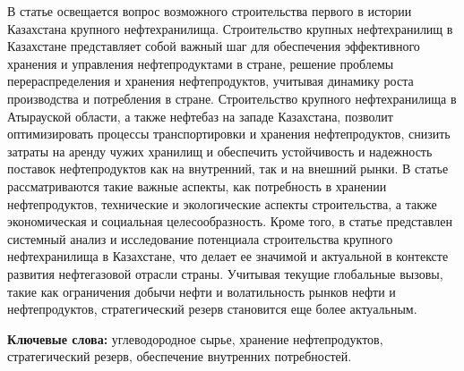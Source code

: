 В статье освещается вопрос возможного строительства первого в истории
Казахстана крупного нефтехранилища. Строительство крупных нефтехранилищ
в Казахстане представляет собой важный шаг для обеспечения эффективного
хранения и управления нефтепродуктами в стране, решение проблемы
перераспределения и хранения нефтепродуктов, учитывая динамику роста
производства и потребления в стране. Строительство крупного
нефтехранилища в Атырауской области, а также нефтебаз на западе
Казахстана, позволит оптимизировать процессы транспортировки и хранения
нефтепродуктов, снизить затраты на аренду чужих хранилищ и обеспечить
устойчивость и надежность поставок нефтепродуктов как на внутренний, так
и на внешний рынки. В статье рассматриваются такие важные аспекты, как
потребность в хранении нефтепродуктов, технические и экологические
аспекты строительства, а также экономическая и социальная
целесообразность. Кроме того, в статье представлен системный анализ и
исследование потенциала строительства крупного нефтехранилища в
Казахстане, что делает ее значимой и актуальной в контексте развития
нефтегазовой отрасли страны. Учитывая текущие глобальные вызовы, такие
как ограничения добычи нефти и волатильность рынков нефти и
нефтепродуктов, стратегический резерв становится еще более актуальным.

{\bfseries Ключевые слова:} углеводородное сырье, хранение нефтепродуктов,
стратегический резерв, обеспечение внутренних потребностей.

